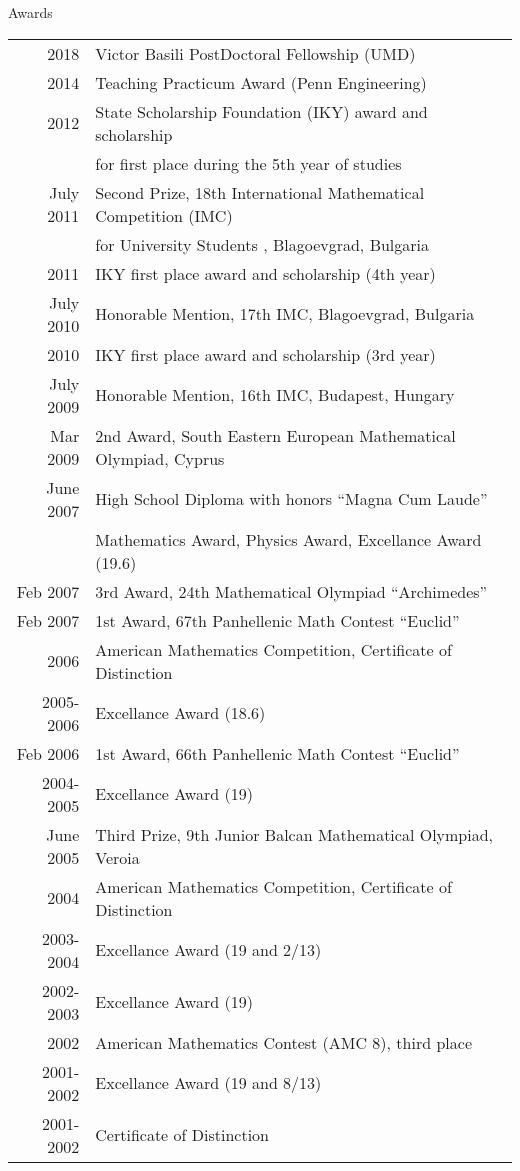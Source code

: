 \documentclass{resume} %
\begin{document}
\pagebreak

\begin{rSection}{Awards}

  \begin{longtable}{rl}
  2018 & Victor Basili PostDoctoral Fellowship (UMD)\\
  2014	 & Teaching Practicum Award (Penn Engineering) \\
  2012 & State Scholarship Foundation (IKY) award and scholarship \\
       & for first place during the 5th year of studies \\
  July  2011  &  Second  Prize,  18th  International Mathematical Competition (IMC) \\
  &  for University Students , Blagoevgrad, Bulgaria \\
  2011 & IKY first place award and scholarship (4th year)\\
  July 2010 &  Honorable Mention,  17th IMC, Blagoevgrad, Bulgaria \\
  2010 & IKY first place award and scholarship (3rd year)\\
  July 2009 &  Honorable Mention,  16th IMC, Budapest, Hungary\\
  Mar 2009  &  2nd Award, South Eastern European Mathematical Olympiad, Cyprus\\

  June  2007 &   High  School  Diploma with  honors  “Magna  Cum  Laude”\\
             &   Mathematics Award, Physics Award,  Excellance Award (19.6)\\
  Feb 2007 &  3rd Award, 24th Mathematical Olympiad “Archimedes”\\
  Feb 2007 &  1st Award, 67th Panhellenic Math Contest “Euclid”\\
  2006 &  American Mathematics Competition, Certificate of Distinction\\
  2005-2006 &  Excellance Award (18.6)\\
  Feb 2006 &  1st Award, 66th Panhellenic Math Contest “Euclid”\\
  2004-2005 &  Excellance Award (19)\\
  June 2005 &  Third Prize, 9th Junior Balcan Mathematical Olympiad, Veroia\\
  2004 &  American Mathematics Competition, Certificate of Distinction\\
  2003-2004&  Excellance Award (19 and 2/13)\\
  2002-2003&  Excellance Award (19)\\
  2002 & American Mathematics Contest (AMC 8), third place\\
  2001-2002&  Excellance Award (19 and 8/13)\\
  2001-2002&  Certificate of Distinction\\
  
\end{longtable}

\end{rSection}
\end{document}
